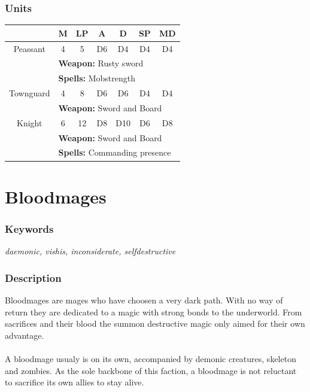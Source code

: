 \documentclass[a5paper,pagesize,10pt,bibtotoc,pointlessnumbers,
normalheadings,DIV=9,twoside=false]{scrbook}
\begin{document}
\subsubsection{Units}
 \begin{tabular}{||c c c c c c c||} 
 \hline
  & M & LP & A & D & SP & MD \\
 \hline\hline
 Peassant & 4 & 5 & D6 & D4 & D4 & D4 \\ 
  & \multicolumn{6}{l||}{\textbf{Weapon:} Rusty sword} \\
  & \multicolumn{6}{l||}{\textbf{Spells:} Mobstrength} \\
 \hline
  Townguard & 4 & 8 & D6 & D6 & D4 & D4 \\ 
  & \multicolumn{6}{l||}{\textbf{Weapon:} Sword and Board} \\
 \hline
 Knight & 6  & 12 & D8 & D10 & D6 & D8 \\
  & \multicolumn{6}{l||}{\textbf{Weapon:} Sword and Board} \\
  & \multicolumn{6}{l||}{\textbf{Spells:} Commanding presence} \\
  \hline

\end{tabular}

\newpage
\section{Bloodmages}

\subsubsection{Keywords}
\emph{daemonic, vishis, inconsiderate, selfdestructive}

\subsubsection{Description}
Bloodmages are mages who have choosen a very dark path. With no way of return they are dedicated to a magic with strong bonds to the underworld.
From sacrifices and their blood the summon destructive magic only aimed for their own advantage.\\
\\
A bloodmage usualy is on its own, accompanied by demonic creatures, skeleton and zombies. As the sole backbone of this faction, a bloodmage is not reluctant to sacrifice its own allies to stay alive.
\end{document}
